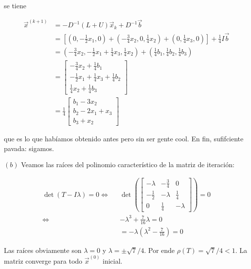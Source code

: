 \documentclass[12pt]{article}
\begin{document}
se tiene 

\begin{align*}
    \overrightarrow{x}^{( k+1 )} 
    &= -D^{-1}(L+U)\overrightarrow{x}_k + D^{-1}\overrightarrow{b}\\ 
    &= 
    \left[ (0, -\frac{1}{2}x_1, 0) + (-\frac{3}{4}x_2, 0, \frac{1}{4}x_2) +
    (0,\frac{1}{4}x_3, 0) \right]  + \frac{1}{4}I \overrightarrow{b} \\ 
    &= (-\frac{3}{4}x_2, -\frac{1}{2}x_1 + \frac{1}{4}x_3, \frac{1}{4}x_2) +
    (\frac{1}{4}b_1, \frac{1}{4}b_2, \frac{1}{4}b_3)\\ 
    &=\begin{bmatrix} 
            -\frac{3}{4} x_2 + \frac{1}{4}b_1 \\ 
            -\frac{1}{2}x_1 + \frac{1}{4}x_3 + \frac{1}{4}b_2 \\ 
            \frac{1}{4}x_2 + \frac{1}{4}b_3
    \end{bmatrix} \\ 
    &=\frac{1}{4}\begin{bmatrix} 
             b_1 - 3x_2 \\ 
             b_2 - 2x_1 + x_3 \\ 
             b_3 + x_2
    \end{bmatrix} 
\end{align*}

que es lo que habíamos obtenido antes pero sin ser gente cool. En fin,
sufifciente pavada: sigamos. 

$(b)$ Veamos las raíces del polinomio característico de la matriz de iteración:

\begin{align*}
\det(T - I\lambda) = 0 
\iff ~ ~ ~
& \det\left( \begin{bmatrix} 
        -\lambda & -\frac{3}{4}  & 0 \\ 
        -\frac{1}{2} & - \lambda & \frac{1}{4} \\ 
        0 & \frac{1}{4} & -\lambda
\end{bmatrix}  \right) =0 \\ 
\iff ~ ~ ~ 
&-\lambda^3 + \frac{7}{16}\lambda = 0 \\ 
&=-\lambda\left( \lambda^2 - \frac{7}{16} \right)  = 0
\end{align*}

Las raíces obviamente son $\lambda = 0$ y $\lambda = \pm \sqrt{7} / 4 $. Por
ende $\rho(T) = \sqrt{7} / 4  < 1$. La matriz converge para todo $\overrightarrow{x}^(0)$
inicial.
\end{document}
